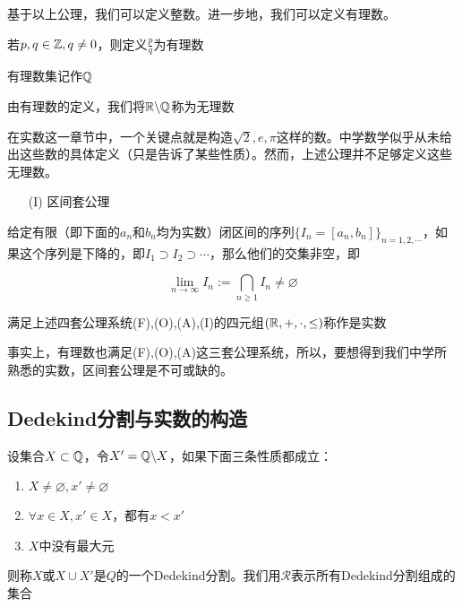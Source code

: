基于以上公理，我们可以定义整数。进一步地，我们可以定义有理数。

\begin{definition}[有理数]
    若$p,q\in\mathbb{Z},q\neq0$，则定义$\displaystyle \frac{p}{q}$为有理数

    有理数集记作$\mathbb{Q}$
\end{definition}

由有理数的定义，我们将$\mathbb{R}\backslash\mathbb{Q}$称为无理数

在实数这一章节中，一个关键点就是构造$\sqrt{2},e,\pi$这样的数。中学数学似乎从未给出这些数的具体定义（只是告诉了某些性质）。然而，上述公理并不足够定义这些无理数。

\begin{itemize}
    \item[(I)] 区间套公理
\end{itemize}

给定有限（即下面的$a_n$和$b_n$均为实数）闭区间的序列$\{I_n = [a_n,b_n]\}_{n=1,2,\cdots}$，如果这个序列是下降的，即$I_1\supset I_2\supset \cdots$，那么他们的交集非空，即

\begin{equation*}
    \lim_{n\rightarrow \infty}I_n:=\bigcap_{n\geq 1}I_n\neq \varnothing
\end{equation*}

\begin{definition}[实数]
    满足上述四套公理系统(F),(O),(A),(I)的四元组$(\mathbb{R},+,\cdot,\leq)$称作是实数
\end{definition}

事实上，有理数也满足(F),(O),(A)这三套公理系统，所以，要想得到我们中学所熟悉的实数，区间套公理是不可或缺的。

\subsection{Dedekind分割与实数的构造}

\begin{definition}[Dedekind分割]
    设集合$X\subset \mathbb{Q}$，令$X' = \mathbb{Q} \backslash X$，如果下面三条性质都成立：

    \begin{enumerate}
        \item $X\neq \varnothing,x'\neq \varnothing$
        \item $\forall x\in X,x'\in X$，都有$x<x'$
        \item $X$中没有最大元
    \end{enumerate}

    则称$X$或$X\cup X'$是$Q$的一个Dedekind分割。我们用$\mathcal{R}$表示所有Dedekind分割组成的集合
\end{definition}

